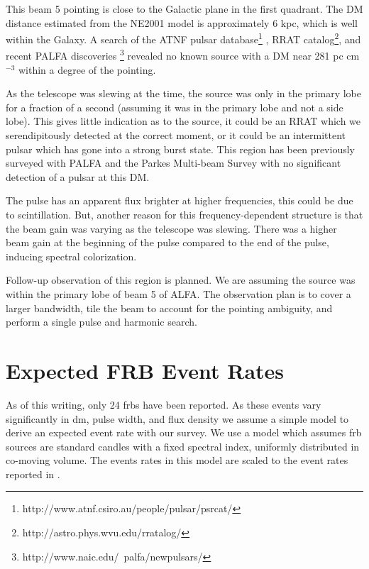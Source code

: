 \documentclass[a4paper,fleqn,usenatbib]{mnras}
\begin{document}
This beam 5 pointing is close to the Galactic plane in the first quadrant. The
DM distance estimated from the NE2001 model \citep{2002astro.ph..7156C} is
approximately 6 kpc, which is well within the Galaxy. A search of the ATNF
pulsar database\footnote{http://www.atnf.csiro.au/people/pulsar/psrcat/}
\citep{2005AJ....129.1993M}, RRAT
catalog\footnote{http://astro.phys.wvu.edu/rratalog/}, and recent PALFA
discoveries \footnote{http://www.naic.edu/~palfa/newpulsars/} revealed no known
source with a DM near 281 pc cm$^{-3}$ within a degree of the pointing.

As the telescope was slewing at the time, the source was only in the primary
lobe for a fraction of a second (assuming it was in the primary lobe and not a
side lobe). This gives little indication as to the source, it could be an RRAT
which we serendipitously detected at the correct moment, or it could be an
intermittent pulsar which has gone into a strong burst state. This region has
been previously surveyed with PALFA and the Parkes Multi-beam Survey
\citep{2001MNRAS.328...17M} with no significant detection of a pulsar at this
DM.

The pulse has an apparent flux brighter at higher frequencies, this could be due
to scintillation. But, another reason for this frequency-dependent structure is
that the beam gain was varying as the telescope was slewing. There was a higher
beam gain at the beginning of the pulse compared to the end of the pulse,
inducing spectral colorization.

Follow-up observation of this region is planned. We are assuming the source was
within the primary lobe of beam 5 of ALFA. The observation plan is to cover a
larger bandwidth, tile the beam to account for the pointing ambiguity, and
perform a single pulse and harmonic search.



\section{Expected FRB Event Rates}
\label{sec:event_rates}

As of this writing, only 24 \glspl{frb} have been reported. As these events vary
significantly in \gls{dm}, pulse width, and flux density we assume a simple
model to derive an expected event rate with our survey.  We use a model
\citep{2013MNRAS.436L...5L} which assumes \gls{frb} sources are standard candles
with a fixed spectral index, uniformly distributed in co-moving volume. The
events rates in this model are scaled to the event rates reported in
\cite{2013Sci...341...53T}.
\end{document}

